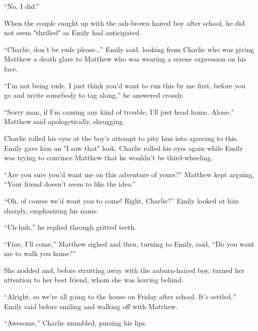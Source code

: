 “No, I did.”

When the couple caught up with the ash-brown haired boy after school, he did not seem "thrilled" as Emily had anticipated.

“Charlie, don’t be rude please…” Emily said, looking from Charlie who was giving Matthew a death glare to Matthew who was wearing a serene expression on his face.

“I’m not being rude. I just think you’d want to run this by me first, before you go and invite somebody to tag along,” he answered crossly.

“Sorry man, if I’m causing any kind of trouble, I’ll just head home. Alone,” Matthew said apologetically, shrugging.

Charlie rolled his eyes at the boy’s attempt to pity him into agreeing to this. Emily gave him an "I saw that" look. Charlie rolled his eyes again while Emily was trying to convince Matthew that he wouldn’t be third-wheeling.

“Are you sure you’d want me on this adventure of yours?” Matthew kept arguing, “Your friend doesn’t seem to like the idea.”

“Oh, of course we’d want you to come! Right, Charlie?” Emily looked at him sharply, emphasizing his name.

“Uh-huh,” he replied through gritted teeth.

“Fine, I’ll come,” Matthew sighed and then, turning to Emily, said, “Do you want me to walk you home?”

She nodded and, before strutting away with the auburn-haired boy, turned her attention to her best friend, whom she was leaving behind.

“Alright, so we’re all going to the house on Friday after school. It’s settled,” Emily said before smiling and walking off with Matthew.

“Awesome,” Charlie mumbled, pursing his lips.